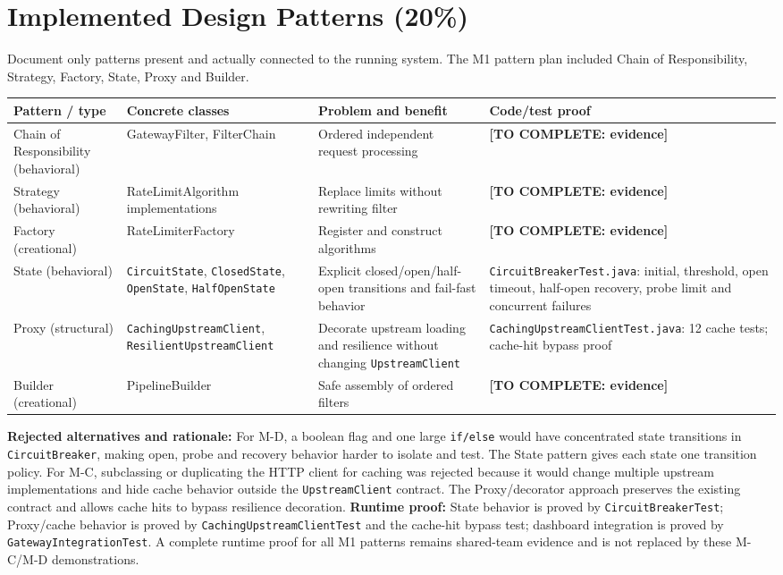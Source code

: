 \documentclass[12pt,a4paper]{article}
\newcommand{\todo}[1]{\textcolor{red!70!black}{\textbf{[TO COMPLETE: #1]}}}
\newcommand{\evidence}[1]{\texttt{#1}}
\begin{document}
\section{Implemented Design Patterns (20\%)}\label{sec:patterns}
Document only patterns present and actually connected to the running system. The M1 pattern plan included Chain of Responsibility, Strategy, Factory, State, Proxy and Builder.
\begin{longtable}{L{2.9cm} L{3.3cm} L{3.8cm} L{3.1cm}}\toprule
\textbf{Pattern / type} & \textbf{Concrete classes} & \textbf{Problem and benefit} & \textbf{Code/test proof}\\\midrule\endhead
Chain of Responsibility (behavioral) & GatewayFilter, FilterChain & Ordered independent request processing & \todo{evidence}\\
Strategy (behavioral) & RateLimitAlgorithm implementations & Replace limits without rewriting filter & \todo{evidence}\\
Factory (creational) & RateLimiterFactory & Register and construct algorithms & \todo{evidence}\\
State (behavioral) & \evidence{CircuitState}, \evidence{ClosedState}, \evidence{OpenState}, \evidence{HalfOpenState} & Explicit closed/open/half-open transitions and fail-fast behavior & \evidence{CircuitBreakerTest.java}: initial, threshold, open timeout, half-open recovery, probe limit and concurrent failures\\
Proxy (structural) & \evidence{CachingUpstreamClient}, \evidence{ResilientUpstreamClient} & Decorate upstream loading and resilience without changing \evidence{UpstreamClient} & \evidence{CachingUpstreamClientTest.java}: 12 cache tests; cache-hit bypass proof\\
Builder (creational) & PipelineBuilder & Safe assembly of ordered filters & \todo{evidence}\\\bottomrule\end{longtable}
\textbf{Rejected alternatives and rationale:} For M-D, a boolean flag and one large \texttt{if/else} would have concentrated state transitions in \texttt{CircuitBreaker}, making open, probe and recovery behavior harder to isolate and test. The State pattern gives each state one transition policy. For M-C, subclassing or duplicating the HTTP client for caching was rejected because it would change multiple upstream implementations and hide cache behavior outside the \texttt{UpstreamClient} contract. The Proxy/decorator approach preserves the existing contract and allows cache hits to bypass resilience decoration.
\textbf{Runtime proof:} State behavior is proved by \texttt{CircuitBreakerTest}; Proxy/cache behavior is proved by \texttt{CachingUpstreamClientTest} and the cache-hit bypass test; dashboard integration is proved by \texttt{GatewayIntegrationTest}. A complete runtime proof for all M1 patterns remains shared-team evidence and is not replaced by these M-C/M-D demonstrations.
\end{document}
